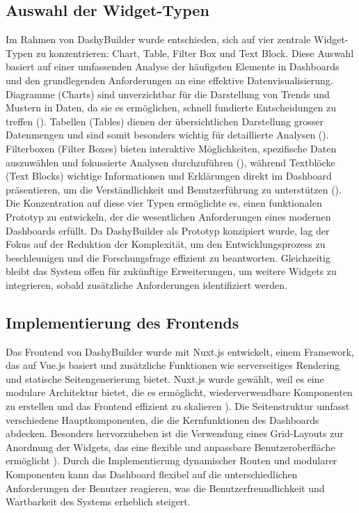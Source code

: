 \documentclass[a4paper, 12pt]{scrartcl}
\begin{document}
\subsection{Auswahl der Widget-Typen}
Im Rahmen von DashyBuilder wurde entschieden, sich auf vier zentrale Widget-Typen zu konzentrieren: Chart, Table, Filter Box und Text Block. Diese Auswahl basiert auf einer umfassenden Analyse der häufigsten Elemente in Dashboards und den grundlegenden Anforderungen an eine effektive Datenvisualisierung. Diagramme (Charts) sind unverzichtbar für die Darstellung von Trends und Mustern in Daten, da sie es ermöglichen, schnell fundierte Entscheidungen zu treffen (\cite{Wang2008}). Tabellen (Tables) dienen der übersichtlichen Darstellung grosser Datenmengen und sind somit besonders wichtig für detaillierte Analysen (\cite{Smailovic2012}). Filterboxen (Filter Boxes) bieten interaktive Möglichkeiten, spezifische Daten auszuwählen und fokussierte Analysen durchzuführen (\cite{Al-Zokari2020AN}), während Textblöcke (Text Blocks) wichtige Informationen und Erklärungen direkt im Dashboard präsentieren, um die Verständlichkeit und Benutzerführung zu unterstützen (\cite{Latif2022}). Die Konzentration auf diese vier Typen ermöglichte es, einen funktionalen Prototyp zu entwickeln, der die wesentlichen Anforderungen eines modernen Dashboards erfüllt. Da DashyBuilder als Prototyp konzipiert wurde, lag der Fokus auf der Reduktion der Komplexität, um den Entwicklungsprozess zu beschleunigen und die Forschungsfrage effizient zu beantworten. Gleichzeitig bleibt das System offen für zukünftige Erweiterungen, um weitere Widgets zu integrieren, sobald zusätzliche Anforderungen identifiziert werden.

\subsection{Implementierung des Frontends}
Das Frontend von DashyBuilder wurde mit Nuxt.js entwickelt, einem Framework, das auf Vue.js basiert und zusätzliche Funktionen wie serverseitiges Rendering und statische Seitengenerierung bietet. Nuxt.js wurde gewählt, weil es eine modulare Architektur bietet, die es ermöglicht, wiederverwendbare Komponenten zu erstellen und das Frontend effizient zu skalieren \cite{Alasaad2022}). Die Seitenstruktur umfasst verschiedene Hauptkomponenten, die die Kernfunktionen des Dashboards abdecken. Besonders hervorzuheben ist die Verwendung eines Grid-Layouts zur Anordnung der Widgets, das eine flexible und anpassbare Benutzeroberfläche ermöglicht \cite{Freeman2019}). Durch die Implementierung dynamischer Routen und modularer Komponenten kann das Dashboard flexibel auf die unterschiedlichen Anforderungen der Benutzer reagieren, was die Benutzerfreundlichkeit und Wartbarkeit des Systems erheblich steigert.
\end{document}
